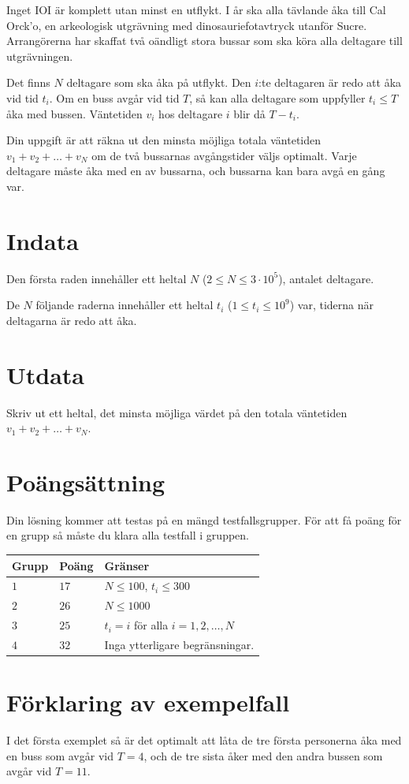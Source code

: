 \noindent


Inget IOI är komplett utan minst en utflykt. I år ska alla tävlande åka till Cal Orck'o,
en arkeologisk utgrävning med dinosauriefotavtryck utanför Sucre. Arrangörerna har
skaffat två oändligt stora bussar som ska köra alla deltagare till utgrävningen.

Det finns $N$ deltagare som ska åka på utflykt. Den $i$:te deltagaren är redo att åka
vid tid $t_i$. Om en buss avgår vid tid $T$, så kan alla deltagare som uppfyller $t_i \leq T$
åka med bussen. Väntetiden $v_i$ hos deltagare $i$ blir då $T-t_i$. 

Din uppgift är att räkna ut den minsta möjliga totala väntetiden $v_1+v_2+\dots+v_N$
om de två bussarnas avgångstider väljs optimalt. Varje deltagare måste åka med en av bussarna, 
och bussarna kan bara avgå en gång var.

\section*{Indata}
Den första raden innehåller ett heltal $N$ ($2 \leq N \leq 3 \cdot 10^5$), antalet deltagare.

De $N$ följande raderna innehåller ett heltal $t_i$ ($1 \leq t_i \leq 10^9$) var, tiderna 
när deltagarna är redo att åka.

\section*{Utdata}
Skriv ut ett heltal, det minsta möjliga värdet på den totala väntetiden $v_1+v_2+\dots+v_N$.

\section*{Poängsättning}
Din lösning kommer att testas på en mängd testfallsgrupper.
För att få poäng för en grupp så måste du klara alla testfall i gruppen.

\noindent
\begin{tabular}{| l | l | p{12cm} |}
  \hline
  \textbf{Grupp} & \textbf{Poäng} & \textbf{Gränser} \\ \hline
  $1$    & $17$        & $N \leq 100$, $t_i \leq 300$\\ \hline
  $2$    & $26$        & $N \leq 1000$ \\ \hline
  $3$    & $25$        & $t_i = i$ för alla $i = 1,2,\dots, N$ \\ \hline
  $4$    & $32$        & Inga ytterligare begränsningar. \\ \hline
\end{tabular}

\section*{Förklaring av exempelfall}

I det första exemplet så är det optimalt att låta de tre första personerna åka
med en buss som avgår vid $T = 4$, och de tre sista åker med den andra bussen 
som avgår vid $T = 11$. 
